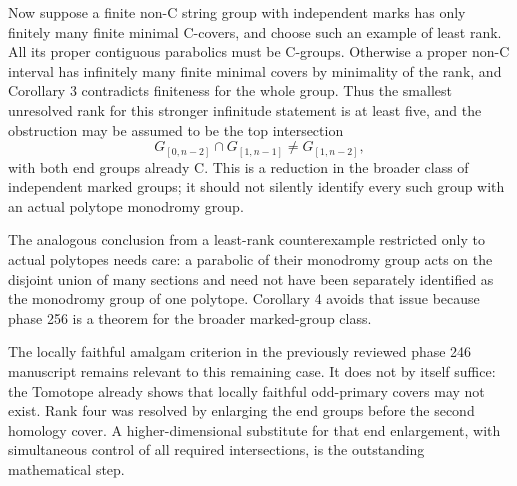 \documentclass[
  11pt,
  a4paper,
]{article}
\begin{document}
Now suppose a finite non-C string group with independent marks has only
finitely many finite minimal C-covers, and choose such an example of
least rank. All its proper contiguous parabolics must be C-groups.
Otherwise a proper non-C interval has infinitely many finite minimal
covers by minimality of the rank, and Corollary 3 contradicts finiteness
for the whole group. Thus the smallest unresolved rank for this stronger
infinitude statement is at least five, and the obstruction may be
assumed to be the top intersection \[
 G_{[0,n-2]}\cap G_{[1,n-1]}\ne G_{[1,n-2]},
\] with both end groups already C. This is a reduction in the broader
class of independent marked groups; it should not silently identify
every such group with an actual polytope monodromy group.

The analogous conclusion from a least-rank counterexample restricted
only to actual polytopes needs care: a parabolic of their monodromy
group acts on the disjoint union of many sections and need not have been
separately identified as the monodromy group of one polytope. Corollary
4 avoids that issue because phase 256 is a theorem for the broader
marked-group class.

The locally faithful amalgam criterion in the previously reviewed phase
246 manuscript remains relevant to this remaining case. It does not by
itself suffice: the Tomotope already shows that locally faithful
odd-primary covers may not exist. Rank four was resolved by enlarging
the end groups before the second homology cover. A higher-dimensional
substitute for that end enlargement, with simultaneous control of all
required intersections, is the outstanding mathematical step.
\end{document}
